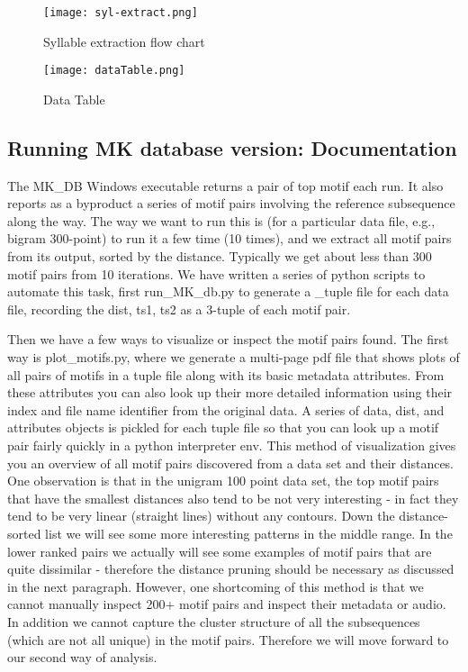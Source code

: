 \documentclass[conference]{IEEEtran}
\begin{document}
\begin{figure*}
\small
 \centerline{
 \texttt{[image: syl-extract.png]}}
 \caption{Syllable extraction flow chart}
 \label{fig:sylext}
\end{figure*}
\begin{figure*}
\small
 \centerline{
 \texttt{[image: dataTable.png]}}
 \caption{Data Table}
 \label{fig:dataTable}
\end{figure*}
\subsection{Running MK database version: Documentation}
The MK\_DB Windows executable returns a pair of top motif each run. It also reports as a byproduct a series of motif pairs involving the reference subsequence along the way. The way we want to run this is (for a particular data file, e.g., bigram 300-point) to run it a few time (10 times), and we extract all motif pairs from its output, sorted by the distance. Typically we get about less than 300 motif pairs from 10 iterations. We have written a series of python scripts to automate this task, first run\_MK\_db.py to generate a \_tuple file for each data file, recording the dist, ts1, ts2 as a 3-tuple of each motif pair. 

Then we have a few ways to visualize or inspect the motif pairs found. The first way is plot\_motifs.py, where we generate a multi-page pdf file that shows plots of all pairs of motifs in a tuple file along with its basic metadata attributes. From these attributes you can also look up their more detailed information using their index and file name identifier from the original data. A series of data, dist, and attributes objects is pickled for each tuple file so that you can look up a motif pair fairly quickly in a python interpreter env. This method of visualization gives you an overview of all motif pairs discovered from a data set and their distances. One observation is that in the unigram 100 point data set, the top motif pairs that have the smallest distances also tend to be not very interesting - in fact they tend to be very linear (straight lines) without any contours. Down the distance-sorted list   we will see some more interesting patterns in the middle range. In the lower ranked pairs we actually will see some examples of motif pairs that are quite dissimilar - therefore the distance pruning should be necessary as discussed in the next paragraph. However, one shortcoming of this method is that we cannot manually inspect 200+ motif pairs and inspect their metadata or audio. In addition we cannot capture the cluster structure of all the subsequences (which are not all unique) in the motif pairs. Therefore we will move forward to our second way of analysis. 
\end{document}
